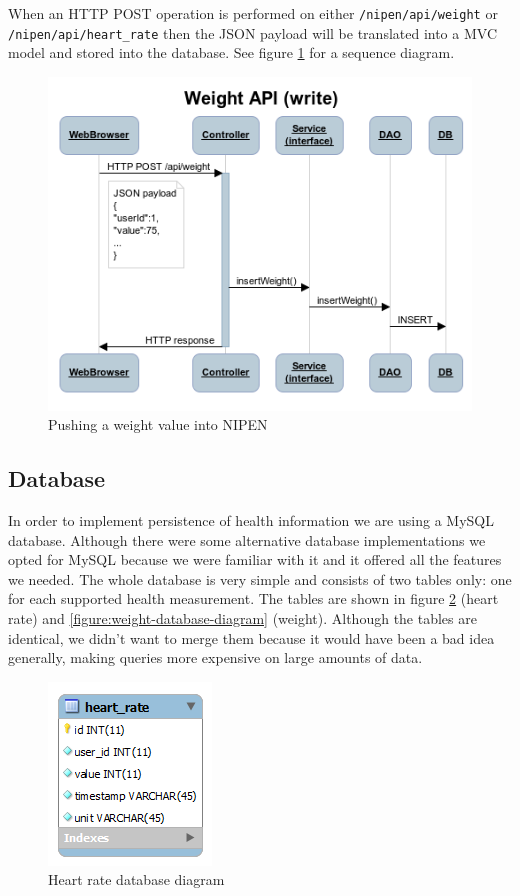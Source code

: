 When an HTTP POST operation is performed on either \verb|/nipen/api/weight| or \newline
\verb|/nipen/api/heart_rate| then the JSON payload will be translated into a MVC model and
stored into the database. See figure \ref{figure:seqw} for a sequence diagram.

\begin{figure}[h]
\centering
\includegraphics[scale=0.8]{../Figures/seqw.png}
\caption{Pushing a weight value into NIPEN}
\label{figure:seqw}
\end{figure}

\clearpage
\subsection{Database}

In order to implement persistence of health information we are using a MySQL database.
Although there were some alternative database implementations we opted for MySQL
because we were familiar with it and it offered all the features we needed.
The whole database is very simple and consists of two tables only: one for each supported health measurement.
The tables are shown in figure \ref{figure:heart-rate-database-diagram} (heart rate)
and \ref{figure:weight-database-diagram} (weight).
Although the tables are identical, we didn't want to merge them because it would 
have been a bad idea generally, making queries more expensive on large amounts of data.

\begin{figure}[h]
\centering
\includegraphics[scale=1.0]{../Figures/heart-rate-database-diagram.png}
\caption{Heart rate database diagram}
\label{figure:heart-rate-database-diagram}
\end{figure}

